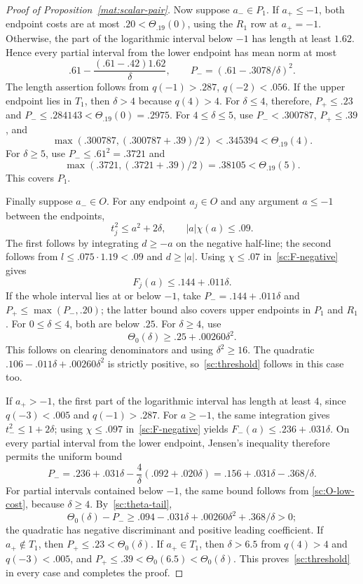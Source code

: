 \documentclass[11pt]{article}
\theoremstyle{definition}
\theoremstyle{remark}
\numberwithin{equation}{section}
\begin{document}
\begin{proof}[Proof of Proposition~\ref{mat:scalar-pair}]
Now suppose $a_-\in P_1$.  If $a_+\le-1$, both endpoint costs are at
most $.20<\Theta_{.19}(0)$, using the $R_1$ row at $a_+=-1$.
Otherwise, the part of the logarithmic
interval below $-1$ has length at least $1.62$.  Hence every partial
interval from the lower endpoint has mean norm at most
\[
 .61-\frac{(.61-.42)1.62}{\delta},\qquad
 P_-=(.61-.3078/\delta)^2.
\]
The length assertion follows from $q(-1)>.287$, $q(-2)<.056$.
If the upper endpoint lies in $T_1$, then $\delta>4$ because $q(4)>4$.
For $\delta\le4$, therefore, $P_+\le.23$ and
$P_-\le.284143<\Theta_{.19}(0)=.2975$.
For $4\le\delta\le5$, use $P_-<.300787$, $P_+\le.39$, and
\[
 \max(.300787,(.300787+.39)/2)<.345394
 <\Theta_{.19}(4).
\]
For $\delta\ge5$, use $P_-\le.61^2=.3721$ and
\[
 \max(.3721,(.3721+.39)/2)=.38105<\Theta_{.19}(5).
\]
This covers $P_1$.

Finally suppose $a_-\in O$.  For any endpoint $a_j\in O$ and any
argument $a\le-1$ between the endpoints,
\[
 t_j^2\le a^2+2\delta,\qquad |a|\chi(a)\le .09.
\]
The first follows by integrating $d\ge-a$ on the negative half-line;
the second follows from $l\le .075\cdot1.19<.09$ and $d\ge|a|$.
Using $\chi\le.07$ in~\eqref{sc:F-negative} gives
\begin{equation}\label{sc:O-low-cost}
 F_j(a)\le .144+.011\delta.
\end{equation}
If the whole interval lies at or below $-1$, take
$P_-=.144+.011\delta$ and
$P_+\le\max(P_-,.20)$; the latter bound also covers upper endpoints
in $P_1$ and $R_1$.
For $0\le\delta\le4$, both are below $.25$.  For $\delta\ge4$, use
\begin{equation}\label{sc:theta-tail}
 \Theta_0(\delta)\ge .25+.00260\delta^2.
\end{equation}
This follows on clearing denominators and using $\delta^2\ge16$.
The quadratic $.106-.011\delta+.00260\delta^2$ is strictly positive,
so~\eqref{sc:threshold} follows in this case too.

If $a_+>-1$, the first part of the logarithmic interval has length at
least $4$, since $q(-3)<.005$ and $q(-1)>.287$.
For $a\ge-1$, the same integration gives $t_-^2\le1+2\delta$;
using $\chi\le.097$ in~\eqref{sc:F-negative} yields
$F_-(a)\le .236+.031\delta$.
On every partial interval from the lower endpoint, Jensen's inequality
therefore permits the uniform bound
\[
 P_-=.236+.031\delta-\frac{4}{\delta}(.092+.020\delta)
     =.156+.031\delta-.368/\delta.
\]
For partial intervals contained below $-1$, the same bound follows from
\eqref{sc:O-low-cost}, because $\delta\ge4$.
By~\eqref{sc:theta-tail},
\[
 \Theta_0(\delta)-P_-
 \ge .094-.031\delta+.00260\delta^2+.368/\delta>0;
\]
the quadratic has negative discriminant and positive leading coefficient.
If $a_+\notin T_1$, then $P_+\le.23<\Theta_0(\delta)$.
If $a_+\in T_1$, then $\delta>6.5$ from $q(4)>4$ and $q(-3)<.005$,
and
$P_+\le.39<\Theta_0(6.5)<\Theta_0(\delta)$.
This proves~\eqref{sc:threshold} in every case and completes the proof.
\end{proof}
\end{document}
